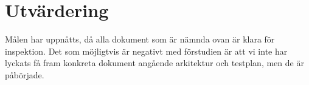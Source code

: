 \section{Utvärdering}
Målen har uppnåtts, då alla dokument som är nämnda ovan är klara för inspektion. Det som möjligtvis är negativt med förstudien är att vi inte har lyckats få fram konkreta dokument angående arkitektur och testplan, men de är påbörjade.